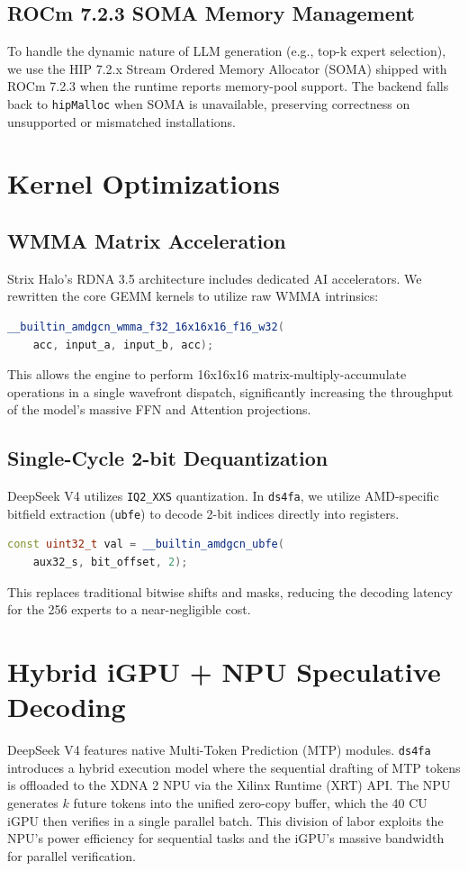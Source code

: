 \documentclass[twocolumn,10pt]{article}
\begin{document}
\subsection{ROCm 7.2.3 SOMA Memory Management}
To handle the dynamic nature of LLM generation (e.g., top-k expert selection), we use the HIP 7.2.x Stream Ordered Memory Allocator (SOMA) shipped with ROCm 7.2.3 when the runtime reports memory-pool support. The backend falls back to \texttt{hipMalloc} when SOMA is unavailable, preserving correctness on unsupported or mismatched installations.

\section{Kernel Optimizations}
\subsection{WMMA Matrix Acceleration}
Strix Halo's RDNA 3.5 architecture includes dedicated AI accelerators. We rewritten the core GEMM kernels to utilize raw WMMA intrinsics:
\begin{lstlisting}[language=C++]
__builtin_amdgcn_wmma_f32_16x16x16_f16_w32(
    acc, input_a, input_b, acc);
\end{lstlisting}
This allows the engine to perform 16x16x16 matrix-multiply-accumulate operations in a single wavefront dispatch, significantly increasing the throughput of the model's massive FFN and Attention projections.

\subsection{Single-Cycle 2-bit Dequantization}
DeepSeek V4 utilizes \texttt{IQ2\_XXS} quantization. In \texttt{ds4fa}, we utilize AMD-specific bitfield extraction (\texttt{ubfe}) to decode 2-bit indices directly into registers.
\begin{lstlisting}[language=C++]
const uint32_t val = __builtin_amdgcn_ubfe(
    aux32_s, bit_offset, 2);
\end{lstlisting}
This replaces traditional bitwise shifts and masks, reducing the decoding latency for the 256 experts to a near-negligible cost.

\section{Hybrid iGPU + NPU Speculative Decoding}
DeepSeek V4 features native Multi-Token Prediction (MTP) modules. \texttt{ds4fa} introduces a hybrid execution model where the sequential drafting of MTP tokens is offloaded to the XDNA 2 NPU via the Xilinx Runtime (XRT) API. 
The NPU generates $k$ future tokens into the unified zero-copy buffer, which the 40 CU iGPU then verifies in a single parallel batch. This division of labor exploits the NPU's power efficiency for sequential tasks and the iGPU's massive bandwidth for parallel verification.
\end{document}
